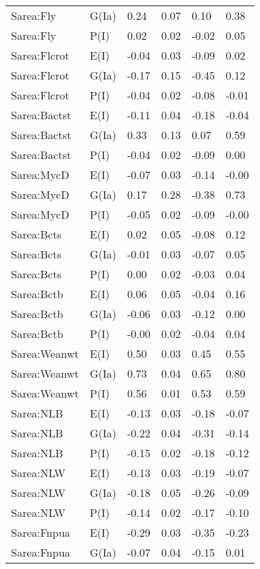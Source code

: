 \begin{center}
\begin{longtable}{|p{1.1in}|p{0.7in}|p{0.7in}|p{0.6in}|p{0.6in}|p{0.6in}|}
  Sarea:Fly & G(Ia) & 0.24 & 0.07 & 0.10 & 0.38 \\ 
  Sarea:Fly & P(I) & 0.02 & 0.02 & -0.02 & 0.05 \\ 
  Sarea:Flcrot & E(I) & -0.04 & 0.03 & -0.09 & 0.02 \\ 
  Sarea:Flcrot & G(Ia) & -0.17 & 0.15 & -0.45 & 0.12 \\ 
  Sarea:Flcrot & P(I) & -0.04 & 0.02 & -0.08 & -0.01 \\ 
  Sarea:Bactst & E(I) & -0.11 & 0.04 & -0.18 & -0.04 \\ 
  Sarea:Bactst & G(Ia) & 0.33 & 0.13 & 0.07 & 0.59 \\ 
  Sarea:Bactst & P(I) & -0.04 & 0.02 & -0.09 & 0.00 \\ 
  Sarea:MycD & E(I) & -0.07 & 0.03 & -0.14 & -0.00 \\ 
  Sarea:MycD & G(Ia) & 0.17 & 0.28 & -0.38 & 0.73 \\ 
  Sarea:MycD & P(I) & -0.05 & 0.02 & -0.09 & -0.00 \\ 
  Sarea:Bcts & E(I) & 0.02 & 0.05 & -0.08 & 0.12 \\ 
  Sarea:Bcts & G(Ia) & -0.01 & 0.03 & -0.07 & 0.05 \\ 
  Sarea:Bcts & P(I) & 0.00 & 0.02 & -0.03 & 0.04 \\ 
  Sarea:Bctb & E(I) & 0.06 & 0.05 & -0.04 & 0.16 \\ 
  Sarea:Bctb & G(Ia) & -0.06 & 0.03 & -0.12 & 0.00 \\ 
  Sarea:Bctb & P(I) & -0.00 & 0.02 & -0.04 & 0.04 \\ 
  Sarea:Weanwt & E(I) & 0.50 & 0.03 & 0.45 & 0.55 \\ 
  Sarea:Weanwt & G(Ia) & 0.73 & 0.04 & 0.65 & 0.80 \\ 
  Sarea:Weanwt & P(I) & 0.56 & 0.01 & 0.53 & 0.59 \\ 
  Sarea:NLB & E(I) & -0.13 & 0.03 & -0.18 & -0.07 \\ 
  Sarea:NLB & G(Ia) & -0.22 & 0.04 & -0.31 & -0.14 \\ 
  Sarea:NLB & P(I) & -0.15 & 0.02 & -0.18 & -0.12 \\ 
  Sarea:NLW & E(I) & -0.13 & 0.03 & -0.19 & -0.07 \\ 
  Sarea:NLW & G(Ia) & -0.18 & 0.05 & -0.26 & -0.09 \\ 
  Sarea:NLW & P(I) & -0.14 & 0.02 & -0.17 & -0.10 \\ 
  Sarea:Fnpua & E(I) & -0.29 & 0.03 & -0.35 & -0.23 \\ 
  Sarea:Fnpua & G(Ia) & -0.07 & 0.04 & -0.15 & 0.01 \\ 

\end{longtable}
\end{center}
